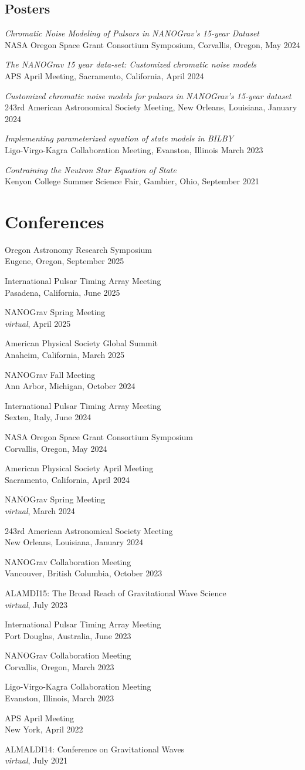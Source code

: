 \documentclass[11pt,letterpaper,sans,unicode]{moderncv}
\newcommand{\confitem}[3]{\item {#1}\\{#2}, #3}
\newcommand{\talkitem}[3]{\item \textit{#1}\\{#2}, #3} %
\begin{document}
{\subsection{Posters}
\begin{etaremune}[leftmargin=8mm]
\small
\talkitem{Chromatic Noise Modeling of Pulsars in NANOGrav's 15-year Dataset}{NASA Oregon Space Grant Consortium Symposium}{Corvallis, Oregon, May 2024}
\talkitem{The NANOGrav 15 year data-set: Customized chromatic noise models}{APS April Meeting}{Sacramento, California, April 2024}
\talkitem{Customized chromatic noise models for pulsars in NANOGrav's 15-year dataset}{243rd American Astronomical Society Meeting}{New Orleans, Louisiana, January 2024}
\talkitem{Implementing parameterized equation of state models in BILBY}{Ligo-Virgo-Kagra Collaboration Meeting}{Evanston, Illinois March 2023}
\talkitem{Contraining the Neutron Star Equation of State}{Kenyon College Summer Science Fair}{Gambier, Ohio, September 2021}
\end{etaremune}


\section{Conferences}
\begin{etaremune}[leftmargin=8mm]
	\confitem{Oregon Astronomy Research Symposium}{Eugene, Oregon}{September 2025}
	\confitem{International Pulsar Timing Array Meeting}{Pasadena, California}{June 2025}
	\confitem{NANOGrav Spring Meeting}{\textit{virtual}}{April 2025}
	\confitem{American Physical Society Global Summit}{Anaheim, California}{March 2025}
	\confitem{NANOGrav Fall Meeting}{Ann Arbor, Michigan}{October 2024}
	\confitem{International Pulsar Timing Array Meeting}{Sexten, Italy}{June 2024}
	\confitem{NASA Oregon Space Grant Consortium Symposium}{Corvallis, Oregon}{May 2024}
    \confitem{American Physical Society April Meeting}{Sacramento, California}{April 2024}
    \confitem{NANOGrav Spring Meeting}{\textit{virtual}}{March 2024} 
    \confitem{243rd American Astronomical Society Meeting}{New Orleans, Louisiana}{January 2024}    \confitem{NANOGrav Collaboration Meeting}{Vancouver, British Columbia}{October 2023}
    \confitem{ALAMDI15: The Broad Reach of Gravitational Wave Science}{\textit{virtual}}{July 2023}
    \confitem{International Pulsar Timing Array Meeting}{Port Douglas, Australia}{June 2023}
    \confitem{NANOGrav Collaboration Meeting}{Corvallis, Oregon}{March 2023}
    \confitem{Ligo-Virgo-Kagra Collaboration Meeting}{Evanston, Illinois}{March 2023}
    \confitem{APS April Meeting}{New York}{April 2022}
    \confitem{ALMALDI14: Conference on Gravitational Waves}{\textit{virtual}}{July 2021}
\end{etaremune}

}
\end{document}
